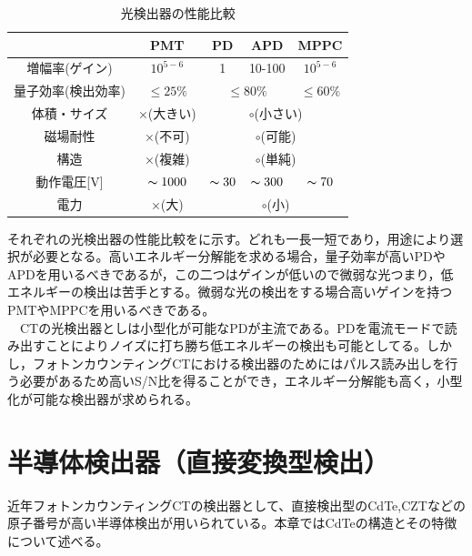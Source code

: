 \begin{table}[H]
\begin{center}
\begin{tabular}{ccccc} \hline
 & PMT & PD & APD & MPPC \\\hline
増幅率(ゲイン) & $10^{5-6}$ & 1 & 10-100 & $10^{5-6}$ \\
量子効率(検出効率) & $\leq25\%$ & \multicolumn{2}{c}{$\leq80\%$} & $\leq60\%$ \\
体積・サイズ& ×(大きい) & \multicolumn{3}{c}{$\circ$(小さい)} \\
磁場耐性 & ×(不可) & \multicolumn{3}{c}{$\circ$(可能)} \\
構造 & ×(複雑) & \multicolumn{3}{c}{$\circ$(単純)} \\
動作電圧[V] & $\thicksim1000$ & $\thicksim30$ & $\thicksim300$& $\thicksim70$ \\
電力&×(大)&\multicolumn{3}{c}{$\circ$(小)}\\\hline
\end{tabular}
\end{center}
\caption{光検出器の性能比較\cite{kataoka}}
\label{detectors}
\end{table}
それぞれの光検出器の性能比較をに示す。どれも一長一短であり，用途により選択が必要となる。高いエネルギー分解能を求める場合，量子効率が高いPDやAPDを用いるべきであるが，この二つはゲインが低いので微弱な光つまり，低エネルギーの検出は苦手とする。微弱な光の検出をする場合高いゲインを持つPMTやMPPCを用いるべきである。\\
\ \ CTの光検出器としは小型化が可能なPDが主流である。PDを電流モードで読み出すことによりノイズに打ち勝ち低エネルギーの検出も可能としてる。しかし，フォトンカウンティングCTにおける検出器のためにはパルス読み出しを行う必要があるため高いS/N比を得ることができ，エネルギー分解能も高く，小型化が可能な検出器が求められる。

\chapter{半導体検出器（直接変換型検出）}
近年フォトンカウンティングCTの検出器として、直接検出型のCdTe,CZTなどの原子番号が高い半導体検出が用いられている。本章ではCdTeの構造とその特徴について述べる。
